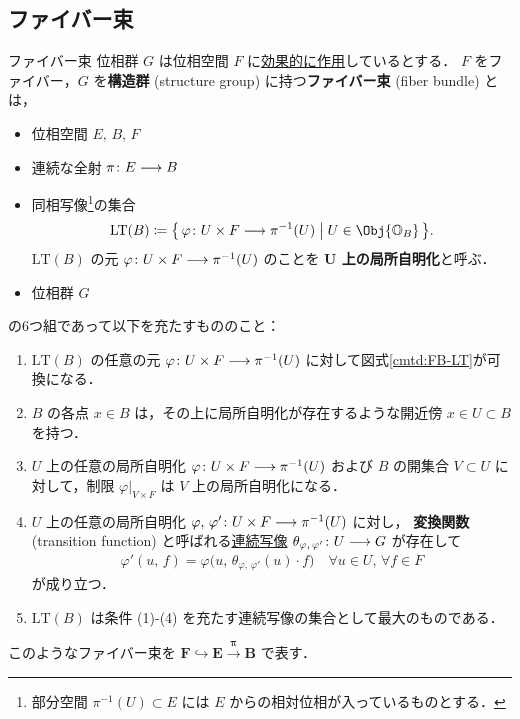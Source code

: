 \documentclass[algtopo_main]{subfiles}
\begin{document}
\subsection{ファイバー束}

\begin{mydef}[label=def:FB, breakable]{ファイバー束}
    位相群 $G$ は位相空間 $F$ に\hyperref[def:TG-action]{効果的に作用}しているとする．
    $F$ をファイバー，$G$ を\textbf{構造群} (structure group) に持つ\textbf{ファイバー束} (fiber bundle) とは，
    \begin{itemize}
        \item 位相空間 $E,\, B,\, F$
        \item 連続な全射 $\pi \colon E \longrightarrow B$
        \item 同相写像\footnote{部分空間 $\pi^{-1}(U) \subset E$ には $E$ からの相対位相が入っているものとする．}の集合
        \begin{align}
            \mathrm{LT}(B) \coloneqq \bigl\{\, \varphi \colon U \times F \lto \pi^{-1}(U) \bigm| U \in \Obj{\mathbb{O}_B} \,\bigr\}.
        \end{align}
        $\mathrm{LT}(B)$ の元 $\varphi \colon U \times F \longrightarrow \pi^{-1}(U)$ のことを\textbf{ $\bm{U}$ 上の局所自明化}と呼ぶ．
        \item 位相群 $G$
    \end{itemize}
    の6つ組であって以下を充たすもののこと：
    \begin{enumerate}
        \item $\mathrm{LT}(B)$ の任意の元 $\varphi \colon U \times F \longrightarrow \pi^{-1}(U)$ に対して図式\ref{cmtd:FB-LT}が可換になる．
        \item $B$ の各点 $x \in B$ は，その上に局所自明化が存在するような開近傍 $x \in U \subset B$ を持つ．
        \item $U$ 上の任意の局所自明化 $\varphi \colon U \times F \longrightarrow \pi^{-1}(U)$ および $B$ の開集合 $V \subset U$ に対して，制限 $\varphi|_{V \times F}$ は $V$ 上の局所自明化になる．
        \item $U$ 上の任意の局所自明化 $\varphi,\, \varphi' \colon U \times F \longrightarrow \pi^{-1}(U)$ に対し，
        \textbf{変換関数} (transition function) と呼ばれる\underline{連続写像} $\theta_{\varphi,\, \varphi'} \colon U \longrightarrow G$ が存在して
        \begin{align}
            \varphi'(u,\, f) = \varphi \bigl(u,\, \theta_{\varphi,\, \varphi'} (u) \cdot f\bigr)\quad \forall u \in U,\, \forall f \in F
        \end{align}
        が成り立つ．
        \item $\mathrm{LT}(B)$ は条件 (1)-(4) を充たす連続写像の集合として最大のものである．
    \end{enumerate}
    このようなファイバー束を $\bm{F \hookrightarrow E \xrightarrow{\pi} B}$ で表す．
\end{mydef}
\end{document}
